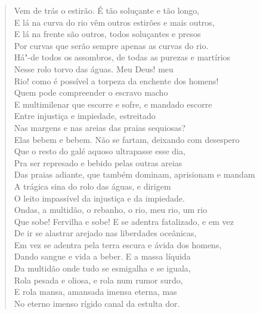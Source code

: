 \begin{verse}
Vem de trás o estirão. É tão soluçante e tão longo,\\
E lá na curva do rio vêm outros estirões e mais outros,\\
E lá na frente são outros, todos soluçantes e presos\\
Por curvas que serão sempre apenas as curvas do rio.\\
Há"-de todos os assombros, de todas as purezas e martírios\\
Nesse rolo torvo das águas. Meu Deus! meu\\
Rio! como é possível a torpeza da enchente dos homens!\\
Quem pode compreender o escravo macho\\
E multimilenar que escorre e sofre, e mandado escorre\\
Entre injustiça e impiedade, estreitado\\
Nas margens e nas areias das praias sequiosas?\\
Elas bebem e bebem. Não se fartam, deixando com desespero\\
Que o resto do galé aquoso ultrapasse esse dia,\\
Pra ser represado e bebido pelas outras areias\\
Das praias adiante, que também dominam, aprisionam e mandam\\
A trágica sina do rolo das águas, e dirigem\\
O leito impassível da injustiça e da impiedade.\\
Ondas, a multidão, o rebanho, o rio, meu rio, um rio\\
Que sobe! Fervilha e sobe! E se adentra fatalizado, e em vez\\
De ir se alastrar arejado nas liberdades oceânicas,\\
Em vez se adentra pela terra escura e ávida dos homens,\\
Dando sangue e vida a beber. E a massa líquida\\
Da multidão onde tudo se esmigalha e se iguala,\\
Rola pesada e oliosa, e rola num rumor surdo,\\
E rola mansa, amansada imensa eterna, mas\\
No eterno imenso rígido canal da estulta dor.


\end{verse}

